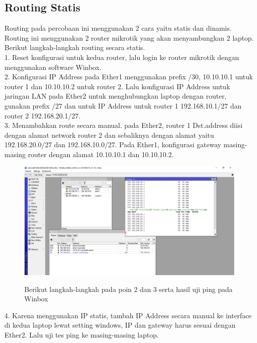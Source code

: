 \subsection{Routing Statis}
Routing pada percobaan ini menggunakan 2 cara yaitu statis dan dinamis. Routing ini menggunakan 2 router mikrotik yang akan menyambungkan 2 laptop. Berikut langkah-langkah routing secara statis. \\ 
1. Reset konfigurasi untuk kedua router, lalu login ke router mikrotik dengan menggunakan software Winbox.\\
2. Konfigurasi IP Address pada Ether1 menggunakan prefix /30, 10.10.10.1 untuk router 1 dan 10.10.10.2 untuk router 2. Lalu konfigurasi IP Address untuk jaringan LAN pada Ether2 untuk menghubungkan laptop dengan router, gunakan prefix /27 dan untuk IP Address untuk router 1 192.168.10.1/27 dan router 2 192.168.20.1/27. \\
3. Menambahkan route secara manual. pada Ether2, router 1 Dst.address diisi dengan alamat network router 2 dan sebaliknya dengan alamat yaitu 192.168.20.0/27 dan 192.168.10.0/27. Pada Ether1, konfigurasi gateway masing-masing router dengan alamat 10.10.10.1 dan 10.10.10.2. \\
\begin{figure}[H]
    \centering
    \includegraphics[width=0.65\linewidth]{image/routing1.png}
    \label{fig:inirujukan}
    \caption{Berikut langkah-langkah pada poin 2 dan 3 serta hasil uji ping pada Winbox}
\end{figure}
4. Karena menggunakan IP statis, tambah IP Address secara manual ke interface di kedua laptop lewat setting windows, IP dan gateway harus sesuai dengan Ether2. Lalu uji tes ping ke masing-masing laptop.
